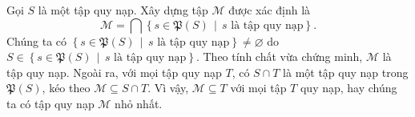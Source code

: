 Gọi $S$ là một tập quy nạp. Xây dựng tập $\mathcal{M}$ được xác định là 
\begin{equation*}
   \mathcal{M} = \bigcap\left\{s \in \mathfrak{P}(S)\,\middle|\,s\text{~là tập quy nạp}\right\}.
\end{equation*}
Chúng ta có $\left\{s \in \mathfrak{P}(S)\,\middle|\,s\text{~là tập quy nạp}\right\} \neq \varnothing$ do $S \in \left\{s \in \mathfrak{P}(S)\,\middle|\,s\text{~là tập quy nạp}\right\}$. Theo tính chất vừa chứng minh, $\mathcal{M}$ là tập quy nạp. Ngoài ra, với mọi tập quy nạp $T$, có $S \cap T$ là một tập quy nạp trong $\mathfrak{P}(S)$, kéo theo $\mathcal{M} \subseteq S \cap T$. Vì vậy, $\mathcal{M} \subseteq T$ với mọi tập $T$ quy nạp, hay chúng ta có tập quy nạp $\mathcal{M}$ nhỏ nhất.

